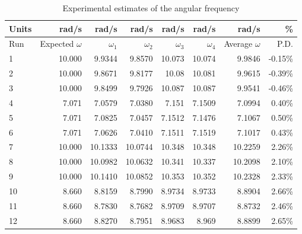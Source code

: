 \begin{table}[ht]
    \centering
    \begin{tabular}{|l|r|r|r|r|r|r|r|}
        \hline
        Units & rad/s & rad/s & rad/s & rad/s & rad/s & rad/s & \% \\
        \hline
        Run & Expected $\omega$ & $\omega_{1}$ & $\omega_{2}$ & $\omega_{3}$ & $\omega_{4}$ & Average $\omega$ & P.D. \\
        \hline
        1 & 10.000 & 9.9344 & 9.8570 & 10.073 & 10.074 & 9.9846 & -0.15\% \\
        2 & 10.000 & 9.8671 & 9.8177 & 10.08 & 10.081 & 9.9615 & -0.39\% \\
        3 & 10.000 & 9.8499 & 9.7926 & 10.087 & 10.087 & 9.9541 & -0.46\% \\
        \hline
        4 & 7.071 & 7.0579 & 7.0380 & 7.151 & 7.1509 & 7.0994 & 0.40\% \\
        5 & 7.071 & 7.0825 & 7.0457 & 7.1512 & 7.1476 & 7.1067 & 0.50\% \\
        6 & 7.071 & 7.0626 & 7.0410 & 7.1511 & 7.1519 & 7.1017 & 0.43\% \\
        \hline
        7 & 10.000 & 10.1333 & 10.0744 & 10.348 & 10.348 & 10.2259 & 2.26\% \\
        8 & 10.000 & 10.0982 & 10.0632 & 10.341 & 10.337 & 10.2098 & 2.10\% \\
        9 & 10.000 & 10.1410 & 10.0852 & 10.353 & 10.352 & 10.2328 & 2.33\% \\
        \hline
        10 & 8.660 & 8.8159 & 8.7990 & 8.9734 & 8.9733 & 8.8904 & 2.66\% \\
        11 & 8.660 & 8.7830 & 8.7682 & 8.9709 & 8.9707 & 8.8732 & 2.46\% \\
        12 & 8.660 & 8.8270 & 8.7951 & 8.9683 & 8.969 & 8.8899 & 2.65\% \\
        \hline
    \end{tabular}
    \caption{Experimental estimates of the angular frequency}
    \label{table.11.omega}
\end{table}
\FloatBarrier
\newpage
